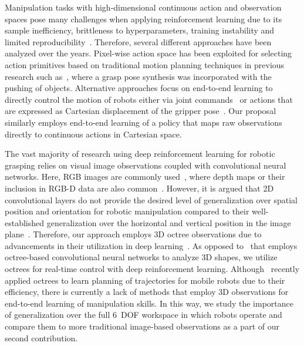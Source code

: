 Manipulation tasks with high-dimensional continuous action and observation spaces pose many challenges when applying reinforcement learning due to its sample inefficiency, brittleness to hyperparameters, training instability and limited reproducibility~\cite{kroemer_review_2021}. Therefore, several different approaches have been analyzed over the years. Pixel-wise action space has been exploited for selecting action primitives based on traditional motion planning techniques in previous research such as~\cite{zeng_learning_2018}, where a grasp pose synthesis was incorporated with the pushing of objects. Alternative approaches focus on end-to-end learning to directly control the motion of robots either via joint commands~\cite{popov_data-efficient_2017,levine_end--end_2015} or actions that are expressed as Cartesian displacement of the gripper pose~\cite{kalashnikov_qt-opt_2018}. Our proposal similarly employs end-to-end learning of a policy that maps raw observations directly to continuous actions in Cartesian space.

The vast majority of research using deep reinforcement learning for robotic grasping relies on visual image observations coupled with convolutional neural networks. Here, RGB images are commonly used~\cite{tobin_domain_2017,kalashnikov_qt-opt_2018,levine_end--end_2015}, where depth maps or their inclusion in RGB-D data are also common~\cite{zeng_learning_2018}. However, it is argued that 2D convolutional layers do not provide the desired level of generalization over spatial position and orientation for robotic manipulation compared to their well-established generalization over the horizontal and vertical position in the image plane~\cite{gualtieri_pick_2018}. Therefore, our approach employs 3D octree observations due to advancements in their utilization in deep learning~\cite{wang_o-cnn_2017,riegler_octnet_2017}. As opposed to~\cite{wang_o-cnn_2017} that employs octree-based convolutional neural networks to analyze 3D shapes, we utilize octrees for real-time control with deep reinforcement learning. Although~\cite{trasnea_octopath_2021} recently applied octrees to learn planning of trajectories for mobile robots due to their efficiency, there is currently a lack of methods that employ 3D observations for end-to-end learning of manipulation skills. In this way, we study the importance of generalization over the full 6~DOF workspace in which robots operate and compare them to more traditional image-based observations as a part of our second contribution.

